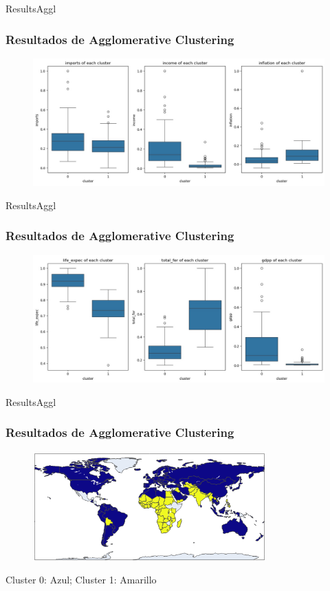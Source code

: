 \documentclass{beamer}
\begin{document}
\begin{frame}{ResultsAggl}
  \frametitle{Resultados de Agglomerative Clustering}
  \begin{figure}
    \includegraphics[width=\textwidth]{../images/agglomerative/features-dist-2.jpg}
  \end{figure}
\end{frame}

\begin{frame}{ResultsAggl}
  \frametitle{Resultados de Agglomerative Clustering}
  \begin{figure}
    \includegraphics[width=\textwidth]{../images/agglomerative/features-dist-3.jpg}
  \end{figure}
\end{frame}

\begin{frame}{ResultsAggl}
  \frametitle{Resultados de Agglomerative Clustering}
  \centering
  \begin{figure}
    \includegraphics[width=0.8\textwidth]{../images/agglomerative/map-cropped.png}
  \end{figure}
  Cluster 0: Azul; Cluster 1: Amarillo
\end{frame}
\end{document}
